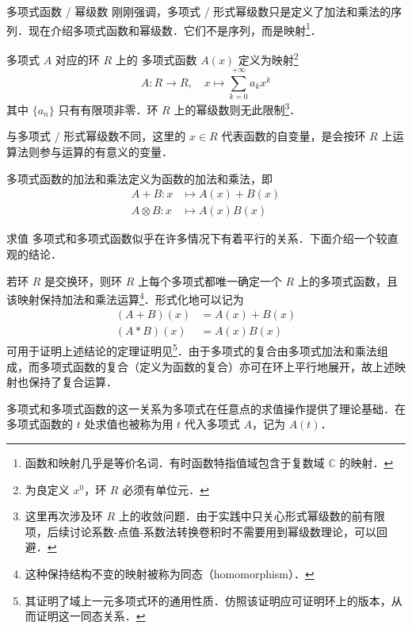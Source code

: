 \documentclass[fontset=fandol]{ctexbeamer}
\newcommand{\myemph}[1]{{\usebeamercolor[fg]{structure} #1}}
\begin{document}
\begin{frame}{多项式函数 / 幂级数}
    刚刚强调，多项式 / 形式幂级数只是定义了加法和乘法的序列．现在介绍多项式函数和幂级数．它们不是序列，而是映射\footnote{函数和映射几乎是等价名词．有时函数特指值域包含于复数域 $\mathbb C$ 的映射．}．

    多项式 $A$ 对应的环 $R$ 上的\myemph{多项式函数} $A(x)$ 定义为映射\footnote{为良定义 $x^0$，环 $R$ 必须有单位元．}
    \[
    A: R \to R,\quad x \mapsto \sum_{k=0}^{+\infty} a_k x^k
    \]
    其中 $\{ a_n \}$ 只有有限项非零．环 $R$ 上的幂级数则无此限制\footnote{这里再次涉及环 $R$ 上的收敛问题．由于实践中只关心形式幂级数的前有限项，后续讨论系数-点值-系数法转换卷积时不需要用到幂级数理论，可以回避．}．

    与多项式 / 形式幂级数不同，这里的 $x \in R$ 代表函数的自变量，是会按环 $R$ 上运算法则参与运算的有意义的变量．

    多项式函数的加法和乘法定义为函数的加法和乘法，即
    \[
    \begin{aligned}
    A+B: x &\mapsto A(x)+B(x) \\
    A \otimes B: x &\mapsto A(x)B(x)
    \end{aligned}
    \]
\end{frame}

\begin{frame}{求值}
    多项式和多项式函数似乎在许多情况下有着平行的关系．下面介绍一个较直观的结论．
    
    \alert{若环 $R$ 是交换环，则环 $R$ 上每个多项式都唯一确定一个 $R$ 上的多项式函数，且该映射保持加法和乘法运算}\footnote{这种保持结构不变的映射被称为同态（homomorphism）．}．形式化地可以记为
    \[
    \begin{aligned}
    (A+B)(x) &= A(x)+B(x) \\
    (A*B)(x) &= A(x)B(x)
    \end{aligned}
    \]
    可用于证明上述结论的定理证明见\cite[第 7 章第 1 节定理 4, p. 7]{qiu-algebra}\footnote{其证明了域上一元多项式环的通用性质．仿照该证明应可证明环上的版本，从而证明这一同态关系．}．由于多项式的复合由多项式加法和乘法组成，而多项式函数的复合（定义为函数的复合）亦可在环上平行地展开，故上述映射也保持了复合运算．
    
    多项式和多项式函数的这一关系为多项式在任意点的求值操作提供了理论基础．在多项式函数的 $t$ 处求值也被称为用 $t$ 代入多项式 $A$，记为 $A(t)$．
\end{frame}
\end{document}
